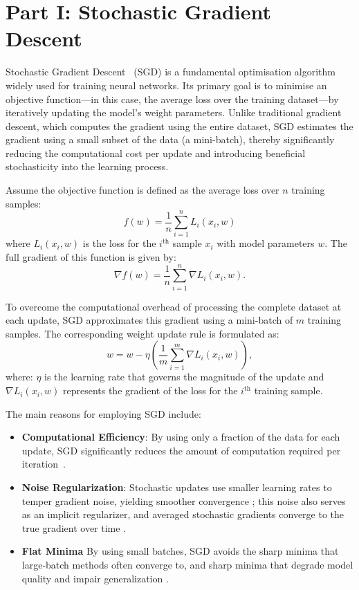 \section{Part I: Stochastic Gradient Descent}

Stochastic Gradient Descent~\cite{robbins1951stochastic} (SGD) is a fundamental optimisation algorithm widely used for training neural networks. Its primary goal is to minimise an objective function—in this case, the average loss over the training dataset—by iteratively updating the model’s weight parameters. Unlike traditional gradient descent, which computes the gradient using the entire dataset, SGD estimates the gradient using a small subset of the data (a mini-batch), thereby significantly reducing the computational cost per update and introducing beneficial stochasticity into the learning process.

Assume the objective function is defined as the average loss over \( n \) training samples:
\[
    f(w) = \frac{1}{n} \sum_{i=1}^{n} L_i(x_i, w)
\]
where \( L_i(x_i, w) \) is the loss for the \( i^{\text{th}} \) sample \( x_i \) with model parameters \( w \). The full gradient of this function is given by:
\[
    \nabla f(w) = \frac{1}{n} \sum_{i=1}^{n} \nabla L_i(x_i, w).
\]

To overcome the computational overhead of processing the complete dataset at each update, SGD approximates this gradient using a mini-batch of \( m \) training samples. The corresponding weight update rule is formulated as:
\[
    w = w - \eta \left( \frac{1}{m} \sum_{i=1}^{m} \nabla L_i(x_i, w) \right),
\]
where: \( \eta \) is the learning rate that governs the magnitude of the update and \( \nabla L_i(x_i, w) \) represents the gradient of the loss for the \( i^{\text{th}} \) training sample.

The main reasons for employing SGD include:
\begin{itemize}
  \item \textbf{Computational Efficiency}: By using only a fraction of the data for each update, SGD significantly reduces the amount of computation required per iteration~\cite{bottou2010large}.
  \item \textbf{Noise Regularization}: Stochastic updates use smaller learning rates to temper gradient noise, yielding smoother convergence \citep{WilsonMartinez2003}; this noise also serves as an implicit regularizer, and averaged stochastic gradients converge to the true gradient over time \citep{GoodfellowBengioCourville2016}.
  \item \textbf{Flat Minima} By using small batches, SGD avoids the sharp minima that large‑batch methods often converge to, and sharp minima that degrade model quality and impair generalization \cite{MishkinSergievskiyMatas2017, KeskarEtAl2017}.
\end{itemize}




